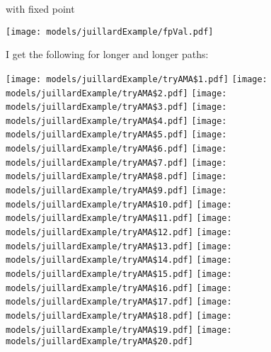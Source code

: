 \documentclass[12pt]{article}
\begin{document}
with fixed point

\texttt{[image: models/juillardExample/fpVal.pdf]}

I get the following for longer and longer paths:

\texttt{[image: models/juillardExample/tryAMA\$1.pdf]}
\texttt{[image: models/juillardExample/tryAMA\$2.pdf]}
\texttt{[image: models/juillardExample/tryAMA\$3.pdf]}
\texttt{[image: models/juillardExample/tryAMA\$4.pdf]}
\texttt{[image: models/juillardExample/tryAMA\$5.pdf]}
\texttt{[image: models/juillardExample/tryAMA\$6.pdf]}
\texttt{[image: models/juillardExample/tryAMA\$7.pdf]}
\texttt{[image: models/juillardExample/tryAMA\$8.pdf]}
\texttt{[image: models/juillardExample/tryAMA\$9.pdf]}
\texttt{[image: models/juillardExample/tryAMA\$10.pdf]}
\texttt{[image: models/juillardExample/tryAMA\$11.pdf]}
\texttt{[image: models/juillardExample/tryAMA\$12.pdf]}
\texttt{[image: models/juillardExample/tryAMA\$13.pdf]}
\texttt{[image: models/juillardExample/tryAMA\$14.pdf]}
\texttt{[image: models/juillardExample/tryAMA\$15.pdf]}
\texttt{[image: models/juillardExample/tryAMA\$16.pdf]}
\texttt{[image: models/juillardExample/tryAMA\$17.pdf]}
\texttt{[image: models/juillardExample/tryAMA\$18.pdf]}
\texttt{[image: models/juillardExample/tryAMA\$19.pdf]}
\texttt{[image: models/juillardExample/tryAMA\$20.pdf]}
\end{document}
